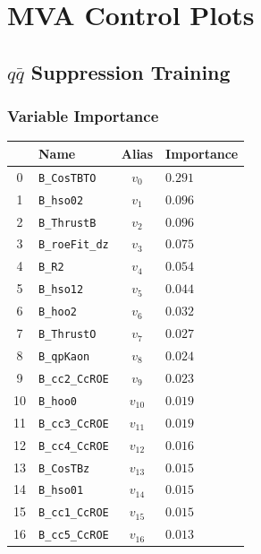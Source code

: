 \chapter{MVA Control Plots}\label{sec:mva-control-plots}
\section{\texorpdfstring{$q \bar q$}{Continuum} Suppression Training}

\subsection{Variable Importance}

\begin{longtable}{c|l|c|l}
& Name & Alias & Importance \\
\toprule 
0 &\texttt{\footnotesize B\_CosTBTO} & $v_{0}$ & $0.291$ \\ 
1 &\texttt{\footnotesize B\_hso02} & $v_{1}$ & $0.096$ \\ 
2 &\texttt{\footnotesize B\_ThrustB} & $v_{2}$ & $0.096$ \\ 
3 &\texttt{\footnotesize B\_roeFit\_dz} & $v_{3}$ & $0.075$ \\ 
4 &\texttt{\footnotesize B\_R2} & $v_{4}$ & $0.054$ \\ 
5 &\texttt{\footnotesize B\_hso12} & $v_{5}$ & $0.044$ \\ 
6 &\texttt{\footnotesize B\_hoo2} & $v_{6}$ & $0.032$ \\ 
7 &\texttt{\footnotesize B\_ThrustO} & $v_{7}$ & $0.027$ \\ 
8 &\texttt{\footnotesize B\_qpKaon} & $v_{8}$ & $0.024$ \\ 
9 &\texttt{\footnotesize B\_cc2\_CcROE} & $v_{9}$ & $0.023$ \\ 
10 &\texttt{\footnotesize B\_hoo0} & $v_{10}$ & $0.019$ \\ 
11 &\texttt{\footnotesize B\_cc3\_CcROE} & $v_{11}$ & $0.019$ \\ 
12 &\texttt{\footnotesize B\_cc4\_CcROE} & $v_{12}$ & $0.016$ \\ 
13 &\texttt{\footnotesize B\_CosTBz} & $v_{13}$ & $0.015$ \\ 
14 &\texttt{\footnotesize B\_hso01} & $v_{14}$ & $0.015$ \\ 
15 &\texttt{\footnotesize B\_cc1\_CcROE} & $v_{15}$ & $0.015$ \\ 
16 &\texttt{\footnotesize B\_cc5\_CcROE} & $v_{16}$ & $0.013$ \\ 

\end{longtable}
